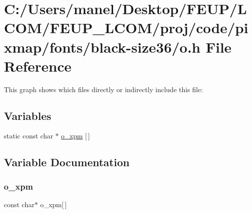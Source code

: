 \hypertarget{black-size36_2o_8h}{}\section{C\+:/\+Users/manel/\+Desktop/\+F\+E\+U\+P/\+L\+C\+O\+M/\+F\+E\+U\+P\+\_\+\+L\+C\+O\+M/proj/code/pixmap/fonts/black-\/size36/o.h File Reference}
\label{black-size36_2o_8h}
This graph shows which files directly or indirectly include this file\+:
\subsection*{Variables}
\begin{DoxyCompactItemize}
\item 
static const char $\ast$ \mbox{\hyperlink{black-size36_2o_8h_ac2f0e26b00d38f1f4c90c21eecef1d85}{o\+\_\+xpm}} \mbox{[}$\,$\mbox{]}
\end{DoxyCompactItemize}


\subsection{Variable Documentation}
\mbox{\label{black-size36_2o_8h_ac2f0e26b00d38f1f4c90c21eecef1d85}} 
\subsubsection{\texorpdfstring{o\_xpm}{o\_xpm}}
{\footnotesize\ttfamily const char$\ast$ o\+\_\+xpm\mbox{[}$\,$\mbox{]}\hspace{0.3cm}{\ttfamily [static]}}

